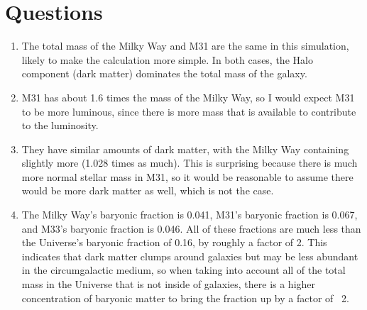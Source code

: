 \documentclass{article}
\begin{document}
\section{Questions}
\begin{enumerate}


\item The total mass of the Milky Way and M31 are the same in this simulation, likely to make the calculation more simple. In both cases, the Halo component (dark matter) dominates the total mass of the galaxy. 


\item M31 has about 1.6 times the mass of the Milky Way, so I would expect M31 to be more luminous, since there is more mass that is available to contribute to the luminosity. 


\item They have similar amounts of dark matter, with the Milky Way containing slightly more (1.028 times as much). This is surprising because there is much more normal stellar mass in M31, so it would be reasonable to assume there would be more dark matter as well, which is not the case. 


\item The Milky Way's baryonic fraction is 0.041, M31's baryonic fraction is 0.067, and M33's baryonic fraction is 0.046. All of these fractions are much less than the Universe's baryonic fraction of 0.16, by roughly a factor of 2. This indicates that dark matter clumps around galaxies but may be less abundant in the circumgalactic medium, so when taking into account all of the total mass in the Universe that is not inside of galaxies, there is a higher concentration of baryonic matter to bring the fraction up by a factor of ~2. 
\end{enumerate}
\end{document}
